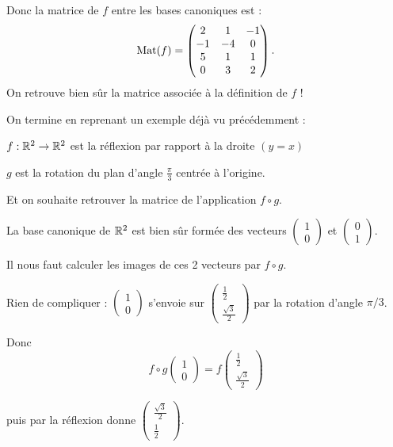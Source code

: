 \change
Donc la matrice de $f$ entre les bases canoniques est :
$$\mathop{\mathrm{Mat}}\nolimits(f) = 
\begin{pmatrix}
2 & 1 & -1 \\
-1& -4& 0  \\
 5& 1 & 1 \\
 0 & 3 & 2 \\              
\end{pmatrix}.$$
On retrouve bien sûr la matrice associée à la définition de $f$ !

\diapo

On termine en reprenant un exemple déjà vu précédemment :

$f : \mathbb{R}^2 \to \mathbb{R}^2$ est la réflexion par rapport à la droite $(y=x)$

\change
$g$ est la rotation du plan d'angle $\frac\pi3$ centrée à l'origine.

\change
Et on souhaite retrouver la matrice de l'application $f\circ g$.

\change
La base canonique de $\mathbb{R}^2$ est bien sûr formée des vecteurs
$\left(\begin{smallmatrix} 1 \\ 0 \end{smallmatrix} \right)$ 
et $\left(\begin{smallmatrix} 0 \\ 1 \end{smallmatrix} \right)$.

\change
Il nous faut calculer les images de ces 2 vecteurs par $f\circ g$.

Rien de compliquer : 
$\begin{pmatrix} 1 \\ 0 \end{pmatrix}$
s'envoie sur $\begin{pmatrix} \frac12 \\ \frac{\sqrt{3}}{2} \end{pmatrix}$
par la rotation d'angle $\pi/3$.

Donc 
$$f\circ g \begin{pmatrix} 1 \\ 0 \end{pmatrix}
= f \begin{pmatrix} \frac12 \\ \frac{\sqrt{3}}{2} \end{pmatrix}$$

puis par la réflexion donne 
$\begin{pmatrix} \frac{\sqrt{3}}{2} \\ \frac12  \end{pmatrix}$.

